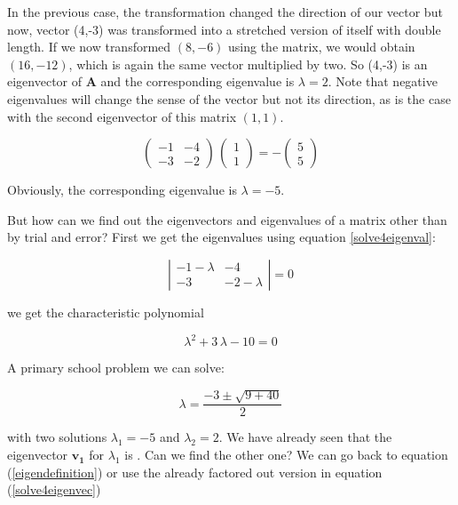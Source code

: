\documentclass{tufte-book} %
\begin{document}
In the previous case, the transformation changed the direction of our vector but now, vector (4,-3) was transformed into a stretched version of itself with double length. If we now transformed $(8,-6)$ using the matrix, we would obtain $(16,-12)$, which is again the same vector multiplied by two. So (4,-3) is an eigenvector of $\mathbf{A}$ and the corresponding eigenvalue is $\lambda=2$. Note that negative eigenvalues will change the sense of the vector but not its direction, as is the case with the second eigenvector of this matrix $(1,1)$.

\begin{equation}
	\begin{pmatrix} -1 & -4\\ -3 & -2\end{pmatrix} \,  \begin{pmatrix} 1\\ 1\end{pmatrix}=- \begin{pmatrix} 5 \\ 5\end{pmatrix}\nonumber
\end{equation}

Obviously, the corresponding eigenvalue is $\lambda=-5$.

But how can we find out the eigenvectors and eigenvalues of a matrix other than by trial and error? First we get the eigenvalues using equation \ref{solve4eigenval}:

\begin{equation}
  \left|\begin{matrix} -1-\lambda & -4\\ -3 & -2-\lambda\end{matrix} \right| = 0 \nonumber
\end{equation}

we get the characteristic polynomial

\begin{equation}
	\lambda^2  +3 \,  \lambda  - 10 = 0 \nonumber
\end{equation}

A primary school problem we can solve:

\begin{equation}
	\lambda= \frac{-3 \pm \sqrt{9+40}}{2} \nonumber
\end{equation}

with two solutions $\lambda_1=-5$ and $\lambda_2=2$. We have already seen that the eigenvector $\mathbf{v_1}$ for $\lambda_1$ is . Can we find the other one? We can go back to equation (\ref{eigendefinition}) or use the already factored out version in equation  (\ref{solve4eigenvec})
\end{document}
